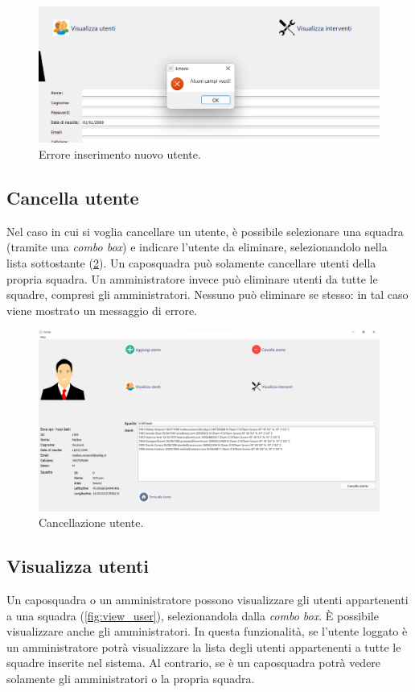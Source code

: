 \begin{figure}[h!]
	\centering
	\includegraphics[width=0.9\linewidth]{./ImageFiles/new_user_error}
	\caption{Errore inserimento nuovo utente.}
	\label{fig:new_user_error}
\end{figure}

\subsection{Cancella utente}
Nel caso in cui si voglia cancellare un utente, è possibile selezionare una squadra (tramite una \textit{combo box}) e indicare l'utente da eliminare, selezionandolo nella lista sottostante (\Fig\ref{fig:delete_user}). Un caposquadra può solamente cancellare utenti della propria squadra. Un amministratore invece può eliminare utenti da tutte le squadre, compresi gli amministratori. Nessuno può eliminare se stesso: in tal caso viene mostrato un messaggio di errore.

\begin{figure}[h!]
	\centering
	\includegraphics[width=1\linewidth]{./ImageFiles/delete_user}
	\caption{Cancellazione utente.}
	\label{fig:delete_user}
\end{figure}

\subsection{Visualizza utenti}
Un caposquadra o un amministratore possono visualizzare gli utenti appartenenti a una squadra (\Fig\ref{fig:view_user}), selezionandola dalla \textit{combo box}. \`E possibile visualizzare anche gli amministratori. In questa funzionalità, se l'utente loggato è un amministratore potrà visualizzare la lista degli utenti appartenenti a tutte le squadre inserite nel sistema. Al contrario, se è un caposquadra potrà vedere solamente gli amministratori o la propria squadra.

